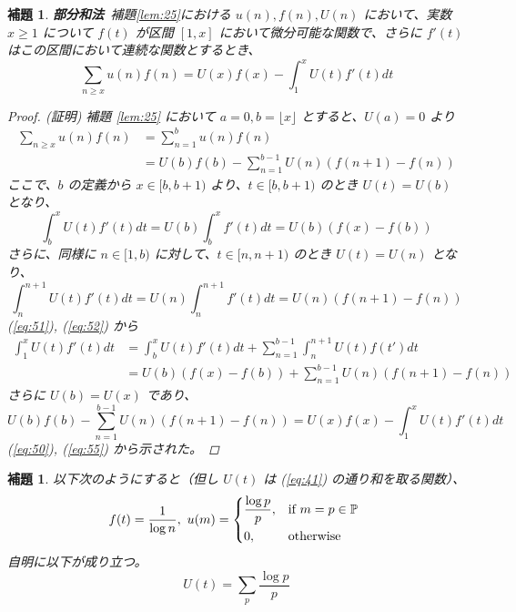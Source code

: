 \documentclass[12pt, a4j]{ltjsarticle}
\newtheorem{lem}[thm]{補題}
\begin{document}
\begin{lem} \label{lem:26}{\bf 部分和法}\
補題\ref{lem:25}における $u(n), f(n), U(n)$ において、実数 $x \ge 1$ について $f(t)$ が区間 $[1,x]$ において微分可能な関数で、さらに $f'(t)$ はこの区間において連続な関数とするとき、
\begin{equation}
\sum_{n\ge x} u(n)f(n) = U(x)f(x) - \int_1^x U(t)f'(t) dt
\end{equation}

\begin{proof}
(証明) 補題 {\it \ref{lem:25}} において $a=0, b=\lfloor x\rfloor$ とすると、$U(a) = 0$ より
\begin{align}
\sum_{n\ge x} u(n)f(n) &= \sum_{n=1}^b u(n)f(n) \\
                       &= U(b)f(b) - \sum_{n=1}^{b-1} U(n)(f(n+1) - f(n))\label{eq:50}
\end{align}
ここで、$b$ の定義から $x \in [b, b+1)$ より、$t \in [b, b+1)$ のとき $U(t)=U(b)$ となり、
\begin{equation}
\int_b^x U(t)f'(t)dt = U(b) \int_b^x f'(t)dt = U(b)(f(x)-f(b))\label{eq:51}
\end{equation}
さらに、同様に $n \in [1, b)$ に対して、$t \in [n, n+1)$ のとき $U(t)=U(n)$ となり、
\begin{equation}
\int_n^{n+1} U(t)f'(t)dt = U(n) \int_n^{n+1} f'(t)dt = U(n)(f(n+1)-f(n))\label{eq:52}
\end{equation}
(\ref{eq:51}), (\ref{eq:52}) から
\begin{align}
\int_1^x U(t)f'(t)dt &= \int_b^x U(t)f'(t)dt + \sum_{n=1}^{b-1} \int_n^{n+1} U(t)f(t')dt \\
                     &= U(b)(f(x)-f(b)) + \sum_{n=1}^{b-1} U(n)(f(n+1)-f(n))
\end{align}
さらに $U(b)=U(x)$ であり、
\begin{equation}
U(b)f(b) - \sum_{n=1}^{b-1} U(n)(f(n+1)-f(n)) = U(x)f(x) - \int_1^x U(t)f'(t)dt\label{eq:55}
\end{equation}
(\ref{eq:50}), (\ref{eq:55}) から示された。
\end{proof}
\end{lem}

\vspace{1cm}

\begin{lem}\label{lem:27}
以下次のようにすると（但し $U(t)$ は {\rm (\ref{eq:41})} の通り和を取る関数）、
\begin{equation}
f(t) = \frac{1}{\log n},\ u(m)=
\begin{cases*}\displaystyle
    \frac{\log p}{p}, & {\rm if} $m = p \in \mathbb{P}$ \\
    0,                & {\rm otherwise}
\end{cases*}
\end{equation}
自明に以下が成り立つ。
\begin{equation}
U(t)=\sum_p \frac{\log p}{p}
\end{equation}
\end{lem}
\end{document}
